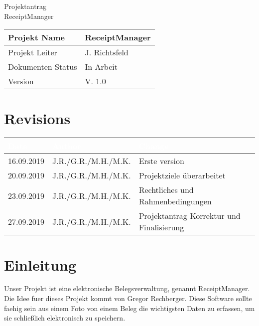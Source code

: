 \documentclass[12pt]{article}
\theoremstyle{definition}
\newcommand{\projectname}{ReceiptManager}
\newcommand{\productname}{ReceiptManager}
\newcommand{\projectleader}{J. Richtsfeld}
\newcommand{\documentstatus}{In Arbeit}
\newcommand{\version}{V. 1.0}
\begin{document}
\begin{titlepage}
\begin{flushright}
\end{flushright}

\vspace{10em}

\begin{center}
{\Huge Projektantrag} \\[3em]
{\LARGE \productname} \\[3em]
\end{center}

\begin{flushleft}
\begin{tabular}{|l|l|}
\hline
Projekt Name & \projectname \\ \hline
Projekt Leiter & \projectleader \\ \hline
Dokumenten Status & \documentstatus \\ \hline
Version & \version \\ \hline
\end{tabular}
\end{flushleft}

\end{titlepage}
\section*{Revisions}
\begin{tabular}{|l|l|l|}
\hline
\cellcolor[gray]{0.5}\textcolor{white}{Date} & \cellcolor[gray]{0.5}\textcolor{white}{Author} & \cellcolor[gray]{0.5}\textcolor{white}{Change} \\ \hline
16.09.2019&J.R./G.R./M.H./M.K.&Erste version \\ \hline
20.09.2019&J.R./G.R./M.H./M.K.&Projektziele überarbeitet \\ \hline
23.09.2019&J.R./G.R./M.H./M.K.&Rechtliches und Rahmenbedingungen \\ \hline
27.09.2019&J.R./G.R./M.H./M.K.&Projektantrag Korrektur und Finalisierung \\ \hline
\end{tabular}
\pagebreak

\tableofcontents
\pagebreak

\section{Einleitung}
Unser Projekt ist eine elektronische Belegsverwaltung, genannt ReceiptManager. Die Idee fuer dieses Projekt kommt von Gregor Rechberger. Diese Software sollte faehig sein aus einem Foto von einem Beleg die wichtigsten Daten zu erfassen, um sie schließlich elektronisch zu speichern. 
\pagebreak
\end{document}
